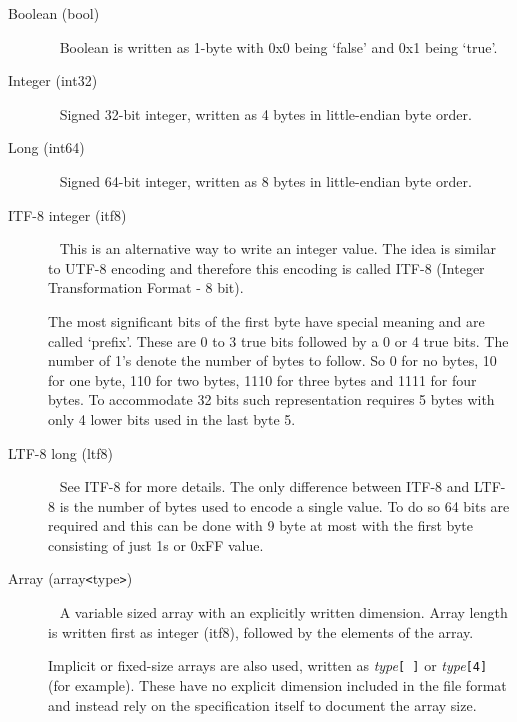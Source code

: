 \documentclass[a4paper]{article}
\begin{document}
\begin{description}

\item[Boolean (bool)]\ \newline
Boolean is written as 1-byte with 0x0 being `false' and 0x1 being `true'.

\item[Integer (int32)]\ \newline
Signed 32-bit integer, written as 4 bytes in little-endian byte order.

\item[Long (int64)]\ \newline
Signed 64-bit integer, written as 8 bytes in little-endian byte order.

\item[ITF-8 integer (itf8)]\ \newline
This is an alternative way to write an integer value. The idea is similar to UTF-8 
encoding and therefore this encoding is called ITF-8 (Integer Transformation Format 
- 8 bit). 

The most significant bits of the first byte have special meaning and are called 
`prefix'. These are 0 to 3 true bits followed by a 0 or 4 true bits. 
The number of 1's denote  the number of bytes to follow. So 0 for no bytes, 10 
for one byte, 110 for two bytes, 1110 for three bytes and 1111 for four bytes.
To accommodate 32 bits such representation requires 
5 bytes with only 4 lower bits used in the last byte 5.

\item[LTF-8 long (ltf8)]\ \newline
See ITF-8 for more details. The only difference between ITF-8 and LTF-8 is the 
number of bytes used to encode a single value. To do so 64 bits are required and 
this can be done with 9 byte at most with the first byte consisting of just 1s 
or 0xFF value. 

\item[{Array (array\texttt{<}type\texttt{>})}]\ \newline
A variable sized array with an explicitly written dimension.
Array length is written first as integer (itf8), followed by the elements of the array.

Implicit or fixed-size arrays are also used, written as \textit{type}\texttt{[ ]} or \textit{type}\texttt{[4]} (for example).
These have no explicit dimension included in the file format and instead rely on the specification itself to document the array size.



\end{description}
\end{document}
